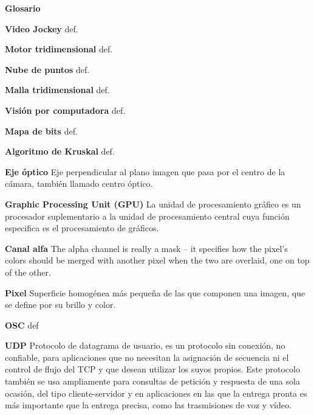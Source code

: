 ﻿\Huge
\textbf{Glosario}

\vspace{10 mm}

\normalsize 

\textbf{Video Jockey}
def. %

\textbf{Motor tridimensional}
def.
 
\textbf{Nube de puntos}
def.

\textbf{Malla tridimensional}
def.

\textbf{Visión por computadora}
def.

\textbf{Mapa de bits}
def.

\textbf{Algoritmo de Kruskal}
def.

\textbf{Eje óptico} 
Eje perpendicular al plano imagen que pasa por el centro de la cámara, también llamado centro óptico\cite{OpticalDesign}.

\textbf{Graphic Processing Unit (GPU)}
La unidad de procesamiento gráfico es un procesador suplementario a la unidad de procesamiento central cuya función especifica es el procesamiento de gráficos\cite{GPUWork}.

\textbf{Canal alfa}
The alpha channel is really a mask -- it specifies how the pixel's colors should be merged with another pixel when the two are overlaid, one on top of the other. 

\textbf{Pixel}
Superficie homogénea más pequeña de las que componen una imagen, que se define por su brillo y color\cite{RAE}.

\textbf{OSC}
def

\textbf{UDP}
Protocolo de datagrama de usuario, es un protocolo sin conexión, no confiable, para aplicaciones que no necesitan la asignación de secuencia ni el control de flujo del TCP y que desean utilizar los suyos propios. Este protocolo también se usa ampliamente para consultas de petición y respuesta de una sola ocasión, del tipo cliente-servidor y en aplicaciones en las que la entrega pronta es más importante que la entrega precisa, como las trasmisiones de voz y vídeo\cite{Tanenbaum}.